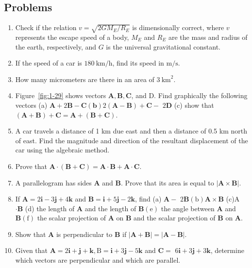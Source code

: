 \documentclass[10pt]{article}
\numberwithin{equation}{section}
\begin{document}
\subsection*{Problems}
\begin{enumerate}
  \item Check if the relation $v=\sqrt{2 G M_{E} / R_{E}}$ is dimensionally correct, where $v$ represents the escape speed of a body, $M_{E}$ and $R_{E}$ are the mass and radius of the earth, respectively, and $G$ is the universal gravitational constant.
  \item If the speed of a car is $180 \mathrm{~km} / \mathrm{h}$, find its speed in $\mathrm{m} / \mathrm{s}$.
  \item How many micrometers are there in an area of $3 \mathrm{~km}^{2}$.
  \item Figure~\ref{fig:1-29} shows vectors $\mathbf{A}, \mathbf{B}, \mathbf{C}$, and D. Find graphically the following vectors (a) $\mathbf{A}+2 \mathbf{B}-\mathbf{C}(\mathbf{b}) 2(\mathbf{A}-\mathbf{B})+\mathbf{C}-$ $2 \mathbf{D}$ (c) show that $(\mathbf{A}+\mathbf{B})+\mathbf{C}=\mathbf{A}+(\mathbf{B}+\mathbf{C})$.
  \item A car travels a distance of 1 km due east and then a distance of 0.5 km north of east. Find the magnitude and direction of the resultant displacement of the car using the algebraic method.
  \item Prove that $\mathbf{A} \cdot(\mathbf{B}+\mathbf{C})=\mathbf{A} \cdot \mathbf{B}+\mathbf{A} \cdot \mathbf{C}$.
  \item A parallelogram has sides $\mathbf{A}$ and $\mathbf{B}$. Prove that its area is equal to $|\mathbf{A} \times \mathbf{B}|$.
  \item If $\mathbf{A}=2 \mathbf{i}-3 \mathbf{j}+4 \mathbf{k}$ and $\mathbf{B}=\mathbf{i}+5 \mathbf{j}-2 \mathbf{k}$, find (a) $\mathbf{A}-$ $2 \mathbf{B}(\mathrm{b}) \mathbf{A} \times \mathbf{B}$ (c)A $\cdot \mathbf{B}$ (d) the length of $\mathbf{A}$ and the length of $\mathbf{B}(\mathrm{e})$ the angle between $\mathbf{A}$ and $\mathbf{B}(\mathrm{f})$ the scalar projection of $\mathbf{A}$ on $\mathbf{B}$ and the scalar projection of $\mathbf{B}$ on $\mathbf{A}$.
  \item Show that $\mathbf{A}$ is perpendicular to $\mathbf{B}$ if $|\mathbf{A}+\mathbf{B}|=|\mathbf{A}-\mathbf{B}|$.
  \item Given that $\mathbf{A}=2 \mathbf{i}+\mathbf{j}+\mathbf{k}, \mathrm{B}=\mathbf{i}+3 \mathbf{j}-5 \mathbf{k}$ and $\mathbf{C}=$ $6 \mathbf{i}+3 \mathbf{j}+3 \mathbf{k}$, determine which vectors are perpendicular and which are parallel.

\end{enumerate}
\end{document}
